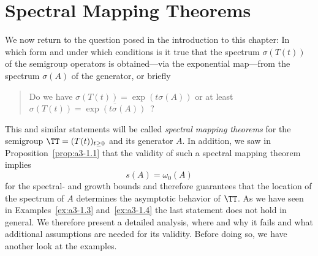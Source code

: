 \section{Spectral Mapping Theorems}\label{sec:a3-6}%
We now return to the question posed in the introduction to this chapter: In which form and under which conditions is it true that the spectrum $\sigma(T(t))$ of the semigroup operators is obtained---via the exponential map---from the spectrum $\sigma(A)$ of the generator, or briefly
\begin{quote}
Do we have  $\sigma(T(t)) = \exp(t \sigma(A) )$  or at least 
 $\sigma(T(t)) = \overline{\exp(t\sigma(A))}$ \,?
\end{quote}
This and similar statements will be called \emph{spectral mapping theorems} for the semigroup $\TT = (T(t))_{t \geq 0}$ and its generator $A$.
In addition, we saw in Proposition~\ref{prop:a3-1.1} that the validity of such a spectral mapping theorem implies
\[
s(A) = \omega_{0}(A)
\]
for the spectral- and growth bounds and therefore guarantees that the location of the spectrum of\/ $A$ determines the asymptotic behavior of\/ $\TT$. 
As we have seen in Examples~\ref{ex:a3-1.3} and~\ref{ex:a3-1.4} the last statement does not hold in general.
We therefore present a detailed analysis, where and why it fails and what additional assumptions are needed for its validity.
Before doing so, we have another look at the examples.
